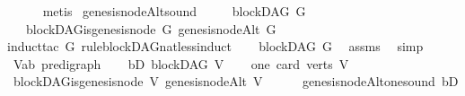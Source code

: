 \begin{isabellebody}
\ \ \ \ \isamarkupfalse%
\ {\isacharparenleft}{\kern0pt}metis{\isacharparenright}{\kern0pt}\isanewline
{}\isamarkupfalse%
%
\endisatagproof
{\isafoldproof}%
%
\isadelimproof
\isanewline
%
\endisadelimproof
\isanewline
{}\isamarkupfalse%
\ genesis{\isacharunderscore}{\kern0pt}nodeAlt{\isacharunderscore}{\kern0pt}sound\ {\isacharcolon}{\kern0pt}\ \isanewline
\ \ \ {\isachardoublequoteopen}blockDAG\ G{\isachardoublequoteclose}\isanewline
\ \ \ {\isachardoublequoteopen}blockDAG{\isachardot}{\kern0pt}is{\isacharunderscore}{\kern0pt}genesis{\isacharunderscore}{\kern0pt}node\ G\ {\isacharparenleft}{\kern0pt}genesis{\isacharunderscore}{\kern0pt}nodeAlt\ G{\isacharparenright}{\kern0pt}{\isachardoublequoteclose}\ \isanewline
%
\isadelimproof
%
\endisadelimproof
%
\isatagproof
{}\isamarkupfalse%
{\isacharparenleft}{\kern0pt}induct{\isacharunderscore}{\kern0pt}tac\ G\ rule{\isacharcolon}{\kern0pt}blockDAG{\isacharunderscore}{\kern0pt}nat{\isacharunderscore}{\kern0pt}less{\isacharunderscore}{\kern0pt}induct{\isacharparenright}{\kern0pt}\isanewline
\ \ \isamarkupfalse%
\ {\isachardoublequoteopen}blockDAG\ G{\isachardoublequoteclose}\ \isamarkupfalse%
\ assms\ \isamarkupfalse%
\ simp\isanewline
{}\isamarkupfalse%
\ \isanewline
\ \ \isamarkupfalse%
\ V{\isacharcolon}{\kern0pt}{\isacharcolon}{\kern0pt}{\isachardoublequoteopen}{\isacharparenleft}{\kern0pt}{\isacharprime}{\kern0pt}a{\isacharcomma}{\kern0pt}{\isacharprime}{\kern0pt}b{\isacharparenright}{\kern0pt}\ pre{\isacharunderscore}{\kern0pt}digraph{\isachardoublequoteclose}\isanewline
\ \ \isamarkupfalse%
\ bD{\isacharcolon}{\kern0pt}\ {\isachardoublequoteopen}blockDAG\ V{\isachardoublequoteclose}\isanewline
\ \ \isamarkupfalse%
\ one{\isacharcolon}{\kern0pt}\ {\isachardoublequoteopen}card\ {\isacharparenleft}{\kern0pt}verts\ V{\isacharparenright}{\kern0pt}\ {\isacharequal}{\kern0pt}\ {}{\isachardoublequoteclose}\isanewline
\ \ \isamarkupfalse%
\ \isamarkupfalse%
\ {\isachardoublequoteopen}blockDAG{\isachardot}{\kern0pt}is{\isacharunderscore}{\kern0pt}genesis{\isacharunderscore}{\kern0pt}node\ V\ {\isacharparenleft}{\kern0pt}genesis{\isacharunderscore}{\kern0pt}nodeAlt\ V{\isacharparenright}{\kern0pt}{\isachardoublequoteclose}\isanewline
\ \ \ \ \isamarkupfalse%
\ genesis{\isacharunderscore}{\kern0pt}nodeAlt{\isacharunderscore}{\kern0pt}one{\isacharunderscore}{\kern0pt}sound\ bD\isanewline

\end{isabellebody}
